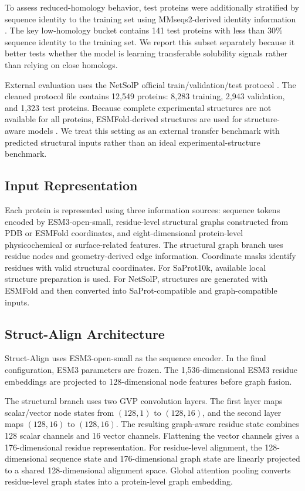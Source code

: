 \documentclass[conference]{IEEEtran}
\begin{document}
To assess reduced-homology behavior, test proteins were additionally stratified by sequence identity to the training set using MMseqs2-derived identity information \cite{Steinegger2017}. The key low-homology bucket contains 141 test proteins with less than 30\% sequence identity to the training set. We report this subset separately because it better tests whether the model is learning transferable solubility signals rather than relying on close homologs.

External evaluation uses the NetSolP official train/validation/test protocol \cite{Thumuluri2022}. The cleaned protocol file contains 12,549 proteins: 8,283 training, 2,943 validation, and 1,323 test proteins. Because complete experimental structures are not available for all proteins, ESMFold-derived structures are used for structure-aware models \cite{Lin2023}. We treat this setting as an external transfer benchmark with predicted structural inputs rather than an ideal experimental-structure benchmark.

\subsection{Input Representation}
Each protein is represented using three information sources: sequence tokens encoded by ESM3-open-small, residue-level structural graphs constructed from PDB or ESMFold coordinates, and eight-dimensional protein-level physicochemical or surface-related features. The structural graph branch uses residue nodes and geometry-derived edge information. Coordinate masks identify residues with valid structural coordinates. For SaProt10k, available local structure preparation is used. For NetSolP, structures are generated with ESMFold and then converted into SaProt-compatible and graph-compatible inputs.

\subsection{Struct-Align Architecture}
Struct-Align uses ESM3-open-small as the sequence encoder. In the final configuration, ESM3 parameters are frozen. The 1,536-dimensional ESM3 residue embeddings are projected to 128-dimensional node features before graph fusion.

The structural branch uses two GVP convolution layers. The first layer maps scalar/vector node states from $(128,1)$ to $(128,16)$, and the second layer maps $(128,16)$ to $(128,16)$. The resulting graph-aware residue state combines 128 scalar channels and 16 vector channels. Flattening the vector channels gives a 176-dimensional residue representation. For residue-level alignment, the 128-dimensional sequence state and 176-dimensional graph state are linearly projected to a shared 128-dimensional alignment space. Global attention pooling converts residue-level graph states into a protein-level graph embedding.
\end{document}
